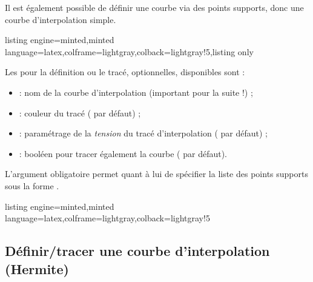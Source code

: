 \documentclass[11pt,a4paper]{ltxdoc}
\begin{document}
Il est également possible de définir une courbe via des points supports, donc une courbe d'interpolation simple.

\begin{tcblisting}{listing engine=minted,minted language=latex,colframe=lightgray,colback=lightgray!5,listing only}
\end{tcblisting}

Les \MontreCode{[clés]} pour la définition ou le tracé, optionnelles, disponibles sont :

\smallskip

\begin{itemize}
	\item {} : nom de la courbe d'interpolation (important pour la suite !) ;
	\item {} : couleur du tracé ( par défaut) ;
	\item {} : paramétrage de la \textit{tension} du tracé d'interpolation ( par défaut) ;
	\item {} : booléen pour tracer également la courbe ( par défaut).
\end{itemize}

L'argument obligatoire permet quant à lui de spécifier la liste des points supports sous la forme .

\begin{tcblisting}{listing engine=minted,minted language=latex,colframe=lightgray,colback=lightgray!5}
\begin{GraphiqueTikz}%
	[x=0.8cm,y=1cm,Xmin=-7,Xmax=4,Ymin=-3,Ymax=5]
\end{GraphiqueTikz}
\end{tcblisting}

\newpage

\subsection{Définir/tracer une courbe d'interpolation (Hermite)}\label{deftracfctspline}
\end{document}
